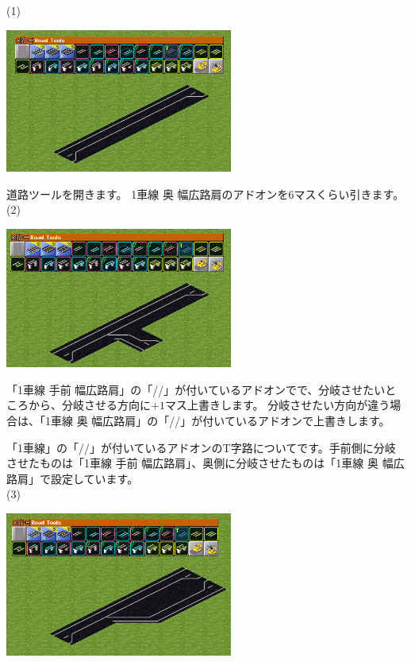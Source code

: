 \documentclass{jbook}
\begin{document}
\begin{multicols}{2}

  (1)

\includegraphics[width = 75mm]{picture/20210214-road-3-1.png}

道路ツールを開きます。
1車線 奥 幅広路肩のアドオンを6マスくらい引きます。\\

(2)

\includegraphics[width = 75mm]{picture/20210214-road-3-2.png}

「1車線 手前 幅広路肩」の「//」が付いているアドオンでで、分岐させたいところから、分岐させる方向に$+1$マス上書きします。
分岐させたい方向が違う場合は、「1車線 奥 幅広路肩」の「//」が付いているアドオンで上書きします。

「1車線」の「//」が付いているアドオンのT字路についてです。手前側に分岐させたものは「1車線 手前 幅広路肩」、奥側に分岐させたものは「1車線 奥 幅広路肩」で設定しています。\\

(3)

\includegraphics[width = 75mm]{picture/20210214-road-3-3.png}


\end{multicols}
\end{document}

